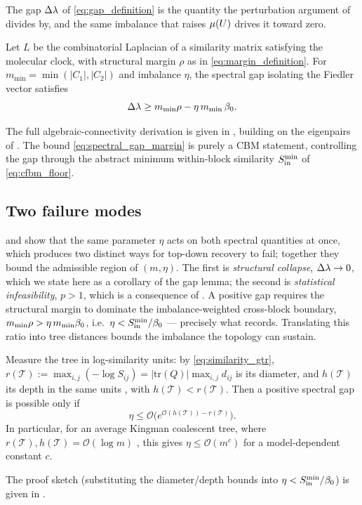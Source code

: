The gap $\Delta\lambda$ of \eqref{eq:gap_definition} is the quantity the perturbation
argument of  divides by, and the same imbalance that raises $\mu(U)$
drives it toward zero.

\begin{lemma}\label{lem:gap}
Let $L$ be the combinatorial Laplacian of a similarity matrix satisfying the
molecular clock, with structural margin $\rho$ as in \eqref{eq:margin_definition}. For
$m_{\min}=\min(|C_1|,|C_2|)$ and imbalance $\eta$, the spectral gap isolating the Fiedler
vector satisfies
\begin{equation}\label{eq:spectral_gap_margin}
   \Delta\lambda \ge m_{\min}\rho-\eta\,m_{\min}\,\beta_0.
\end{equation}
\end{lemma}
\noindent The full algebraic-connectivity derivation is given in ,
building on the eigenpairs of . The bound
\eqref{eq:spectral_gap_margin} is purely a CBM statement, controlling the gap
through the abstract minimum within-block similarity $S_{\mathrm{in}}^{\min}$ of
\eqref{eq:cfbm_floor}.

\subsection{Two failure modes}\label{sec:bridging-failure}

 and  show that the same parameter $\eta$ acts
on both spectral quantities at once, which produces two distinct ways for
top-down recovery to fail; together they bound the admissible region of
$(m,\eta)$. The first is \emph{structural collapse},
$\Delta\lambda\to0$, which we state here as a corollary of the gap lemma; the second is
\emph{statistical infeasibility}, $p>1$, which is a consequence of
. A positive gap requires the structural margin to
dominate the imbalance-weighted cross-block boundary,
$m_{\min}\rho>\eta\,m_{\min}\beta_0$, i.e.\
$\eta<S_{\mathrm{in}}^{\min}/\beta_0$ --- precisely what  records.
Translating this
ratio into tree distances bounds the imbalance the topology can sustain.

\begin{corollary}\label{cor:tolerance}
Measure the tree in log-similarity units: by \eqref{eq:similarity_gtr},
$r(\mathcal T):=\max_{i,j}(-\log S_{ij})=|\mathrm{tr}(Q)|\max_{i,j}d_{ij}$ is its diameter,
and $h(\mathcal T)$ its depth in the same units \cite{aizenbud2023spectral}, with
$h(\mathcal T)<r(\mathcal T)$.
Then a positive spectral gap is possible only if
\begin{equation}\label{eq:eta_distance_bound}
   \eta\le\mathcal O\!\bigl(e^{\mathcal O(h(\mathcal T))-r(\mathcal T)}\bigr).
\end{equation}
In particular, for an average Kingman coalescent tree, where
$r(\mathcal T),h(\mathcal T)=\mathcal O(\log m)$
\cite{erdos1999logs, aldous2001stochastic}, this gives $\eta\le\mathcal O(m^c)$ for
a model-dependent constant $c$.
\end{corollary}
\noindent The proof sketch (substituting the diameter/depth bounds into
$\eta<S_{\mathrm{in}}^{\min}/\beta_0$) is given in \Cref{app:comp1}.

